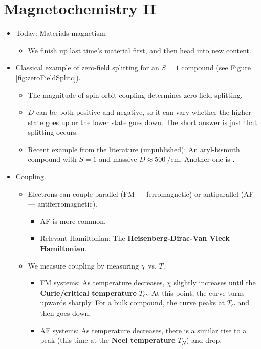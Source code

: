 \documentclass[../notes.tex]{subfiles}
\begin{document}
\section{Magnetochemistry II}
\begin{itemize}
    \item {}Today: Materials magnetism.
    \begin{itemize}
        \item We finish up last time's material first, and then head into new content.
    \end{itemize}
    \item Classical example of zero-field splitting for an $S=1$ compound (see Figure \ref{fig:zeroFieldSplitc}).
    \begin{itemize}
        \item The magnitude of spin-orbit coupling determines zero-field splitting.
        \item $D$ can be both positive and negative, so it can vary whether the higher state goes up or the lower state goes down. The short answer is just that splitting occurs.
        \item Recent example from the literature (unpublished): An aryl-bismuth compound with $S=1$ and massive $D\approx\SI{500}{\per\centi\meter}$. Another one is .
    \end{itemize}
    \item Coupling.
    \begin{itemize}
        \item Electrons can couple parallel (FM --- ferromagnetic) or antiparallel (AF --- antiferromagnetic).
        \begin{itemize}
            \item AF is more common.
            \item Relevant Hamiltonian: The \textbf{Heisenberg-Dirac-Van Vleck Hamiltonian}.
        \end{itemize}
        \item We measure coupling by measuring $\chi$ vs. $T$.
        \begin{itemize}
            \item FM systems: As temperature decreases, $\chi$ slightly increases until the \textbf{Curie/critical temperature} $T_C$. At this point, the curve turns upwards sharply. For a bulk compound, the curve peaks at $T_C$ and then goes down.
            \item AF systems: As temperature decreases, there is a similar rise to a peak (this time at the \textbf{Neel temperature} $T_N$) and drop.

\end{itemize}
\end{itemize}
\end{itemize}
\end{document}
